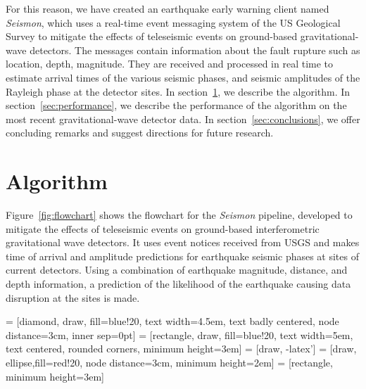 \documentclass[twocolumn, prl, superscriptaddress]{revtex4}
\begin{document}
For this reason, we have created an earthquake early warning client named \emph{Seismon}, which uses a real-time event messaging system of the US Geological Survey to mitigate the effects of teleseismic events on ground-based gravitational-wave detectors. The messages contain information about the fault rupture such as location, depth, magnitude. They are received and processed in real time to estimate arrival times of the various seismic phases, and seismic amplitudes of the Rayleigh phase at the detector sites.
In section~\ref{sec:algorithm}, we describe the algorithm.
In section~\ref{sec:performance}, we describe the performance of the algorithm on the most recent gravitational-wave detector data.
In section~\ref{sec:conclusions}, we offer concluding remarks and suggest directions for future research.

\section{Algorithm}
\label{sec:algorithm}

Figure~\ref{fig:flowchart} shows the flowchart for the \emph{Seismon} pipeline, developed to mitigate the effects of teleseismic events on ground-based interferometric gravitational wave detectors. It uses event notices received from USGS and makes time of arrival and amplitude predictions for earthquake seismic phases at sites of current detectors. Using a combination of earthquake magnitude, distance, and depth information, a prediction of the likelihood of the earthquake causing data disruption at the sites is made.

 = [diamond, draw, fill=blue!20,
    text width=4.5em, text badly centered, node distance=3cm, inner sep=0pt]
 = [rectangle, draw, fill=blue!20,
    text width=5em, text centered, rounded corners, minimum height=3em]
 = [draw, -latex']
 = [draw, ellipse,fill=red!20, node distance=3cm,
    minimum height=2em]
 = [rectangle, minimum height=3em]
\end{document}
